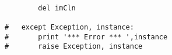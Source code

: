 \begin{verbatim}
		
		del imCln

#	except Exception, instance:
#		print '*** Error *** ',instance
#		raise Exception, instance

\end{verbatim}

